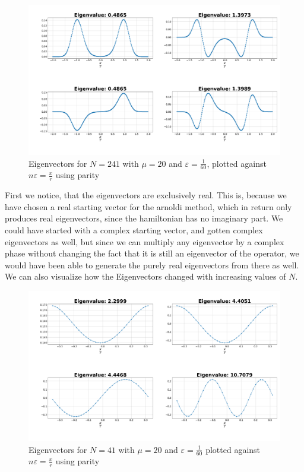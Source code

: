 \documentclass[11pt, letterpaper, onecolumn]{article}
\begin{document}
 	\begin{figure} [H] 
	\begin{center}
	\includegraphics[width=15cm]{"eigenvectors_Parity.png"}
	\caption{Eigenvectors for $N=241$ with $\mu=20$ and $\varepsilon=\frac{1}{60}$, plotted against $n\varepsilon=\frac{x}{r}$ using parity}
	\end{center}
	\end{figure}
 	First we notice, that the eigenvectors are exclusively real. This is, because we have chosen a real starting vector for the arnoldi method, which in return only produces real eigenvectors, since the hamiltonian has no imaginary part. We could have started with a complex starting vector, and gotten complex eigenvectors as well, but since we can multiply any eigenvector by a complex phase without changing the fact that it is still an eigenvector of the operator, we would have been able to generate the purely real eigenvectors from there as well.\\
  	We can also visualize how the Eigenvectors changed with increasing values of $N$.

   	\begin{figure} [H] 
	\begin{center}
	\includegraphics[width=15cm]{"inf_vol_lim_N41.png"}
	\caption{Eigenvectors for $N=41$ with $\mu=20$ and $\varepsilon=\frac{1}{60}$ plotted against $n\varepsilon=\frac{x}{r}$ using parity}
	\end{center}
	\end{figure}
 	
\end{document}
